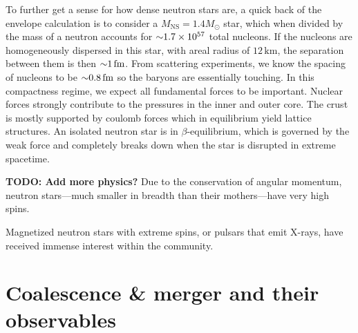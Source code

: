 To further get a sense for how dense neutron stars are, a quick back of the envelope calculation is to consider a $M_\textrm{NS} = 1.4 M _\odot$ star, which when divided by the mass of a neutron accounts for $\mathord{\sim} 1.7 \times 10^{57}$ total nucleons.
If the nucleons are homogeneously dispersed in this star, with areal radius of $12\,\textrm{km}$, the separation between them is then $\mathord{\sim} 1\,\textrm{fm}$.
From scattering experiments, we know the spacing of nucleons to be $\mathord{\sim} 0.8\,\textrm{fm}$ so the baryons are essentially touching.
In this compactness regime, we expect all fundamental forces to be important.
Nuclear forces strongly contribute to the pressures in the inner and outer core.
The crust is mostly supported by coulomb forces which in equilibrium yield lattice structures.
An isolated neutron star is in $\beta$-equilibrium, which is governed by the weak force and completely breaks down when the star is disrupted in extreme spacetime.


\textbf{TODO: Add more physics?}
Due to the conservation of angular momentum, neutron stars---much smaller in breadth than their mothers---have very high spins.

Magnetized neutron stars with extreme spins, or pulsars that emit X-rays,
 have received immense interest within the community.


%
%

\section{Coalescence \& merger and their observables}
\label{sec:observables}

